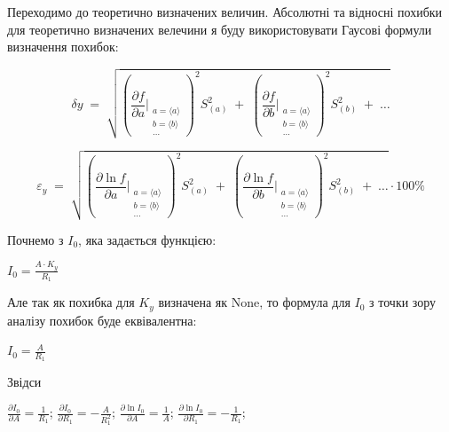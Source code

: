 \documentclass[12pt, a4paper]{article}
\begin{document}
    Переходимо до теоретично визначених величин. Абсолютні та відносні похибки для теоретично визначених велечини я буду використовувати Гаусові формули визначення похибок:

    \[
        \delta y \;=\;
        \sqrt{
        \left(
            \frac{\partial f}{\partial a}\Bigg|_{\substack{a=\langle a\rangle \\ b=\langle b\rangle \\ \dots}}
        \right)^{2} S_{(a)}^{2}
        \;+\;
        \left(
            \frac{\partial f}{\partial b}\Bigg|_{\substack{a=\langle a\rangle \\ b=\langle b\rangle \\ \dots}}
        \right)^{2} S_{(b)}^{2}
        \;+\;\dots
        }
    \]

    \[
        \varepsilon_y \;=\;
        \sqrt{
        \left(
            \frac{\partial \ln f}{\partial a}\Bigg|_{\substack{a=\langle a\rangle \\ b=\langle b\rangle \\ \dots}}
        \right)^{2} S_{(a)}^{2}
        \;+\;
        \left(
            \frac{\partial \ln f}{\partial b}\Bigg|_{\substack{a=\langle a\rangle \\ b=\langle b\rangle \\ \dots}}
        \right)^{2} S_{(b)}^{2}
        \;+\;\dots
        } \cdot 100 \%
    \]
    
    Почнемо з $I_0$, яка задається функцією:

    \begin{center}
        $\displaystyle I_0 = \frac{A \cdot K_y}{R_1}$
    \end{center}

    Але так як похибка для $K_y$ визначена як None, то формула для $I_0$ з точки зору аналізу похибок буде еквівалентна:

    \begin{center}
        $\displaystyle I_0 = \frac{A}{R_1}$
    \end{center}

    Звідси

    \begin{center}
        $\displaystyle \frac{\partial I_0}{\partial A} = \frac{1}{R_1}$; $\displaystyle \frac{\partial I_0}{\partial R_1} = -\frac{A}{R_1^2}$;
        $\displaystyle \frac{\partial \ln I_0}{\partial A} = \frac{1}{A}$; $\displaystyle \frac{\partial \ln I_0}{\partial R_1} = -\frac{1}{R_1}$;
    \end{center}
\end{document}
